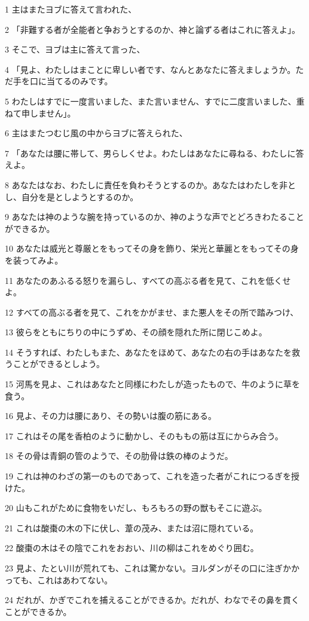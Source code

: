 \par 1 主はまたヨブに答えて言われた、
\par 2 「非難する者が全能者と争おうとするのか、神と論ずる者はこれに答えよ」。
\par 3 そこで、ヨブは主に答えて言った、
\par 4 「見よ、わたしはまことに卑しい者です、なんとあなたに答えましょうか。ただ手を口に当てるのみです。
\par 5 わたしはすでに一度言いました、また言いません、すでに二度言いました、重ねて申しません」。
\par 6 主はまたつむじ風の中からヨブに答えられた、
\par 7 「あなたは腰に帯して、男らしくせよ。わたしはあなたに尋ねる、わたしに答えよ。
\par 8 あなたはなお、わたしに責任を負わそうとするのか。あなたはわたしを非とし、自分を是としようとするのか。
\par 9 あなたは神のような腕を持っているのか、神のような声でとどろきわたることができるか。
\par 10 あなたは威光と尊厳とをもってその身を飾り、栄光と華麗とをもってその身を装ってみよ。
\par 11 あなたのあふるる怒りを漏らし、すべての高ぶる者を見て、これを低くせよ。
\par 12 すべての高ぶる者を見て、これをかがませ、また悪人をその所で踏みつけ、
\par 13 彼らをともにちりの中にうずめ、その顔を隠れた所に閉じこめよ。
\par 14 そうすれば、わたしもまた、あなたをほめて、あなたの右の手はあなたを救うことができるとしよう。
\par 15 河馬を見よ、これはあなたと同様にわたしが造ったもので、牛のように草を食う。
\par 16 見よ、その力は腰にあり、その勢いは腹の筋にある。
\par 17 これはその尾を香柏のように動かし、そのももの筋は互にからみ合う。
\par 18 その骨は青銅の管のようで、その肋骨は鉄の棒のようだ。
\par 19 これは神のわざの第一のものであって、これを造った者がこれにつるぎを授けた。
\par 20 山もこれがために食物をいだし、もろもろの野の獣もそこに遊ぶ。
\par 21 これは酸棗の木の下に伏し、葦の茂み、または沼に隠れている。
\par 22 酸棗の木はその陰でこれをおおい、川の柳はこれをめぐり囲む。
\par 23 見よ、たとい川が荒れても、これは驚かない。ヨルダンがその口に注ぎかかっても、これはあわてない。
\par 24 だれが、かぎでこれを捕えることができるか。だれが、わなでその鼻を貫くことができるか。

